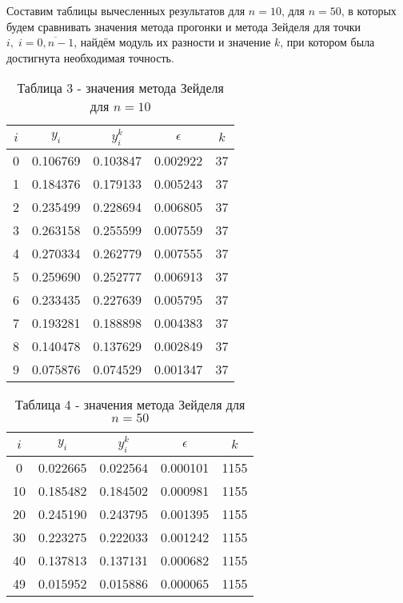 \documentclass[a4paper,12pt]{article}
\begin{document}
{		Составим таблицы вычесленных результатов для $n = 10$, для $n = 50$, 
		в которых будем сравнивать значения метода прогонки и метода Зейделя для точки $i,\; i = \overline{0, n - 1}$, 
		найдём модуль их разности и значение $k$, при котором была достигнута необходимая точность.
		\begin{table}[h]
			\centering
			\begin{tabular}{|c|c|c|c|c|}
				\hline
				$i$ & $y_i$ & $y_i^{k}$ & $\epsilon$ & $k$ \\
				\hline
				0 & 0.106769 & 0.103847 & 0.002922 & 37 \\
				\hline
				1 & 0.184376 & 0.179133 & 0.005243 & 37 \\
				\hline
				2 & 0.235499 & 0.228694 & 0.006805 & 37 \\
				\hline
				3 & 0.263158 & 0.255599 & 0.007559 & 37 \\
				\hline
				4 & 0.270334 & 0.262779 & 0.007555 & 37 \\
				\hline
				5 & 0.259690 & 0.252777 & 0.006913 & 37 \\
				\hline
				6 & 0.233435 & 0.227639 & 0.005795 & 37 \\
				\hline
				7 & 0.193281 & 0.188898 & 0.004383 & 37 \\
				\hline
				8 & 0.140478 & 0.137629 & 0.002849 & 37 \\
				\hline
				9 & 0.075876 & 0.074529 & 0.001347 & 37 \\
				\hline
			\end{tabular}
			\caption*{\small{Таблица 3 - значения метода Зейделя для $n = 10$}}
		\end{table}
		\begin{table}[h]
			\centering
			\begin{tabular}{|c|c|c|c|c|}
				\hline
				$i$ & $y_i$ & $y_i^{k}$ & $\epsilon$ & $k$ \\
				\hline
				0 & 0.022665 & 0.022564 & 0.000101 & 1155 \\
				\hline
				10 & 0.185482 & 0.184502 & 0.000981 & 1155 \\
				\hline
				20 & 0.245190 & 0.243795 & 0.001395 & 1155 \\
				\hline
				30 & 0.223275 & 0.222033 & 0.001242 & 1155 \\
				\hline
				40 & 0.137813 & 0.137131 & 0.000682 & 1155 \\
				\hline
				49 & 0.015952 & 0.015886 & 0.000065 & 1155 \\
				\hline
			\end{tabular}
			\caption*{\small{Таблица 4 - значения метода Зейделя для $n = 50$}}
		\end{table}
		\clearpage
}
\end{document}

